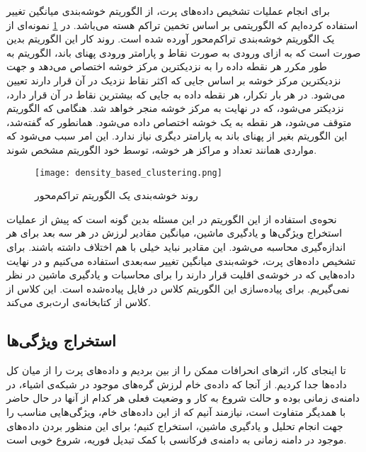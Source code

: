 برای انجام عملیات تشخیص داده‌های پرت، از الگوریتم خوشه‌بندی میانگین تغییر استفاده کرده‌ایم که الگوریتمی بر اساس تخمین تراکم هسته می‌باشد. در \cref{fig:density_based_clustering}\cite{carreira2015review} نمونه‌ای از یک الگوریتم خوشه‌بندی تراکم‌محور آورده شده است. روند کار این الگوریتم بدین صورت است که به ازای ورودی به صورت نقاط و پارامتر ورودی پهنای باند، الگوریتم به طور مکرر هر نقطه داده را به نزدیکترین مرکز خوشه اختصاص می‌دهد و جهت نزدیکترین مرکز خوشه بر اساس جایی که اکثر نقاط نزدیک در آن قرار دارند تعیین می‌شود. در هر بار تکرار، هر نقطه داده به جایی که بیشترین نقاط در آن قرار دارد، نزدیکتر می‌شود، که در نهایت به مرکز خوشه منجر خواهد شد. هنگامی که الگوریتم متوقف می‌شود، هر نقطه به یک خوشه اختصاص داده می‌شود. همانطور که گفته‌شد، این الگوریتم بغیر از پهنای باند به پارامتر دیگری نیاز ندارد. این امر سبب می‌شود که مواردی همانند تعداد و مراکز هر خوشه، توسط خود الگوریتم مشخص شوند\cite{carreira2015review}.

\begin{figure}[!h]
\centerline{\texttt{[image: density\_based\_clustering.png]}}
\caption{روند خوشه‌بندی یک الگوریتم تراکم‌محور\cite{carreira2015review}}
\label{fig:density_based_clustering}
\end{figure}

نحوه‌ی استفاده از این الگوریتم در این مسئله بدین گونه است که پیش از عملیات استخراج ویژگی‌ها و یادگیری ماشین، میانگین مقادیر لرزش در هر سه بعد برای هر اندازه‌گیری محاسبه می‌شود. این مقادیر نباید خیلی با هم اختلاف داشته باشند. برای تشخیص داده‌های پرت، خوشه‌بندی میانگین تغییر سه‌بعدی استفاده می‌کنیم و در نهایت داده‌هایی که در خوشه‌ی اقلیت قرار دارند را برای محاسبات و یادگیری ماشین در نظر نمی‌گیریم\cite{jung2017vibration}. برای پیاده‌سازی این الگوریتم کلاس  در فایل  پیاده‌شده است. این کلاس از کلاس  از کتابخانه‌ی  ارث‌بری می‌کند.


\subsection{استخراج ویژگی‌ها}
تا اینجای کار، اثرهای انحرافات ممکن را از بین بردیم و داده‌های پرت را از میان کل داده‌ها جدا کردیم. از آنجا که داده‌ی خام لرزش گره‌های موجود در شبکه‌ی اشیاء، در دامنه‌ی زمانی بوده و حالت شروع به کار و وضعیت فعلی هر کدام از آنها در حال حاضر با همدیگر متفاوت است، نیازمند آنیم که از این داده‌های خام، ویژگی‌هایی مناسب را جهت انجام تحلیل و یادگیری ماشین، استخراج کنیم؛ برای این منظور بردن داده‌های موجود در دامنه زمانی به دامنه‌ی فرکانسی با کمک تبدیل فوریه، شروع خوبی است.

